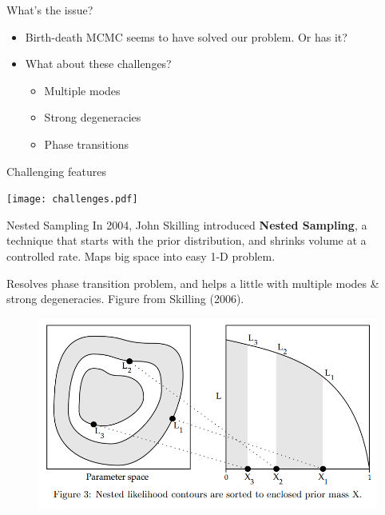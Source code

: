 \begin{frame}[t]{What's the issue?}
\begin{itemize}
\setlength{\itemsep}{20pt}
\item Birth-death MCMC seems to have solved our problem. Or has it?
\item What about these challenges?
\vspace{20pt}
  \begin{itemize}
  \setlength{\itemsep}{20pt}
  \item Multiple modes
  \item Strong degeneracies
  \item Phase transitions
  \end{itemize}
\end{itemize}
\end{frame}

\begin{frame}[t]{Challenging features}
\begin{center}
\texttt{[image: challenges.pdf]}
\end{center}
\end{frame}

\begin{frame}[t]{Nested Sampling}
In 2004, John Skilling introduced {\bf Nested Sampling}, a technique
that starts with the prior distribution, and shrinks volume at a controlled
rate. Maps big space into easy 1-D problem.

Resolves phase transition problem, and helps a little with multiple modes \&
strong degeneracies. Figure from Skilling (2006).

\begin{figure}
\begin{center}
\includegraphics[scale=0.2]{ns.png}
\end{center}
\end{figure}

\end{frame}

